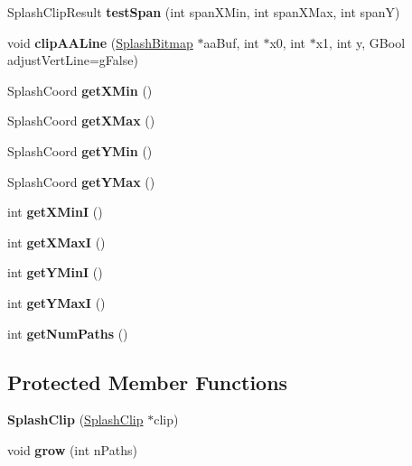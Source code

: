 \begin{DoxyCompactItemize}
Splash\+Clip\+Result {\bfseries test\+Span} (int span\+X\+Min, int span\+X\+Max, int spanY)
\item 
\mbox{\label{class_splash_clip_a2ff6fe565aeddac7caad19417e9362d4}} 
void {\bfseries clip\+A\+A\+Line} (\hyperlink{class_splash_bitmap}{Splash\+Bitmap} $\ast$aa\+Buf, int $\ast$x0, int $\ast$x1, int y, G\+Bool adjust\+Vert\+Line=g\+False)
\item 
\mbox{\label{class_splash_clip_aa6c679175ffa734897a3ac5bd77b30eb}} 
Splash\+Coord {\bfseries get\+X\+Min} ()
\item 
\mbox{\label{class_splash_clip_a7be72bf36b488de8c4e11cb9fb603b75}} 
Splash\+Coord {\bfseries get\+X\+Max} ()
\item 
\mbox{\label{class_splash_clip_af34858747c6e759d91d64ff0aa6ff2bc}} 
Splash\+Coord {\bfseries get\+Y\+Min} ()
\item 
\mbox{\label{class_splash_clip_ac352c6224b9cff747c318b49470b74ef}} 
Splash\+Coord {\bfseries get\+Y\+Max} ()
\item 
\mbox{\label{class_splash_clip_ae882b00782b092fbfa5eb4f3d36383d9}} 
int {\bfseries get\+X\+MinI} ()
\item 
\mbox{\label{class_splash_clip_a51eba79e07d37bab9bcfaab239184f03}} 
int {\bfseries get\+X\+MaxI} ()
\item 
\mbox{\label{class_splash_clip_aee60cb9bcc3633b57b274382618fa2bf}} 
int {\bfseries get\+Y\+MinI} ()
\item 
\mbox{\label{class_splash_clip_a91ed03ab2e6c29b1afca1b6e6ff62e28}} 
int {\bfseries get\+Y\+MaxI} ()
\item 
\mbox{\label{class_splash_clip_a7659681f431e2719debfc4a439c7b0d3}} 
int {\bfseries get\+Num\+Paths} ()
\end{DoxyCompactItemize}
\subsection*{Protected Member Functions}
\begin{DoxyCompactItemize}
\item 
\mbox{\label{class_splash_clip_a0f9b128d9fd9cf728edb6f5ea22c564f}} 
{\bfseries Splash\+Clip} (\hyperlink{class_splash_clip}{Splash\+Clip} $\ast$clip)
\item 
\mbox{\label{class_splash_clip_a44f393beb75f0727c4660253de06668a}} 
void {\bfseries grow} (int n\+Paths)
\end{DoxyCompactItemize}
